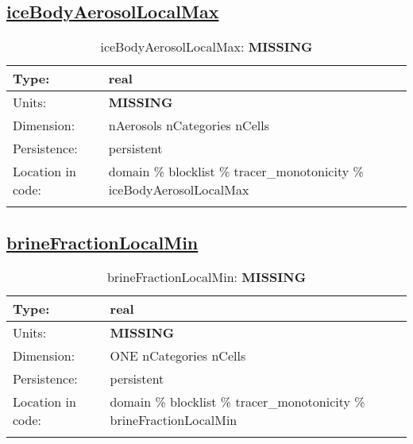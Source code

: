\subsection[iceBodyAerosolLocalMax]{\hyperref[sec:var_tab_tracer_monotonicity]{iceBodyAerosolLocalMax}}
\label{subsec:var_sec_tracer_monotonicity_iceBodyAerosolLocalMax}
\begin{center}
\begin{longtable}{| p{2.0in} | p{4.0in} |}
        \hline 
        Type: & real \\
        \hline 
        Units: & {\bf \color{red} MISSING} \\
        \hline 
        Dimension: & nAerosols nCategories nCells \\
        \hline 
        Persistence: & persistent \\
        \hline 
         Location in code: & domain \% blocklist \% tracer\_monotonicity \% iceBodyAerosolLocalMax \\
         \hline 
    \caption{iceBodyAerosolLocalMax: {\bf \color{red} MISSING}}
\end{longtable}
\end{center}
\subsection[brineFractionLocalMin]{\hyperref[sec:var_tab_tracer_monotonicity]{brineFractionLocalMin}}
\label{subsec:var_sec_tracer_monotonicity_brineFractionLocalMin}
\begin{center}
\begin{longtable}{| p{2.0in} | p{4.0in} |}
        \hline 
        Type: & real \\
        \hline 
        Units: & {\bf \color{red} MISSING} \\
        \hline 
        Dimension: & ONE nCategories nCells \\
        \hline 
        Persistence: & persistent \\
        \hline 
         Location in code: & domain \% blocklist \% tracer\_monotonicity \% brineFractionLocalMin \\
         \hline 
    \caption{brineFractionLocalMin: {\bf \color{red} MISSING}}
\end{longtable}
\end{center}
